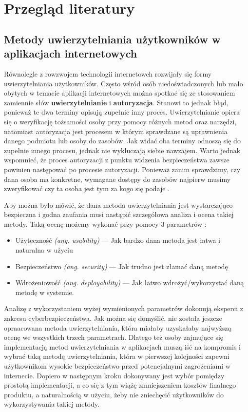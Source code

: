 \chapter{Przegląd literatury}
\section{Metody uwierzytelniania użytkowników w aplikacjach internetowych}
Równolegle z rowzwojem technologii internetowch rozwijały się formy uwierzytelniania użytkowników. Często wśród osób niedoświadczonych lub mało obytych w temacie aplikacji internetowych można spotkać się ze stosowaniem zamiennie słów \textbf{uwierzytelnianie} i \textbf{autoryzacja}. Stanowi to jednak błąd, ponieważ te dwa terminy opisują zupełnie inny proces. Uwierzytelnianie opiera się o weryfikację tożsamości osoby przy pomocy różnych metod oraz narzędzi, natomiast autoryzacja jest procesem w którym sprawdzane są uprawnienia danego podmiotu lub osoby do zasobów. Jak widać oba terminy odnoszą się do zupełnie innego procesu, jednak nie wykluczają siebie nawzajem. Warto jednak wspomnieć, że proces autoryzacji z punktu widzenia bezpieczeństwa zawsze powinien następować po procesie autoryzacji. Ponieważ zanim sprawdzimy, czy dana osoba ma konkretne, wymagane dostępy do zasobów najpierw musimy zweryfikować czy ta osoba jest tym za kogo się podaje \cite{JK2020}.

Aby można było mówić, że dana metoda uwierzytelniania jest wystarczająco bezpieczna i godna zaufania musi nastąpić szczegółowa analiza i ocena takiej metody. Taką ocenę możemy wykonać przy pomocy 3 parametrów \cite{CyberArk}:
\begin{itemize}
  \item Użyteczność \emph{(ang. usability)} --- Jak bardzo dana metoda jest łatwa i naturalna w użyciu
  \item Bezpieczeństwo \emph{(ang. security)} --- Jak trudno jest złamać daną metodę
  \item Wdrożeniowość \emph{(ang. deployability)} --- Jak łatwo wdrożyć/wykorzystać daną metodę w systemie.  
\end{itemize}

Analizę z wykorzystaniem wyżej wymienionych parametrów dokonują eksperci z zakresu cyberbezpieczeństwa. Jak można się domyślić, nie została jeszcze opraacowana metoda uwierzytelniania, która miałaby uzyskałaby najwyższą ocenę we wszystkich trzech parametrach. Dlatego też osoby zajmujące się implementacją metod uwierzytelniania w aplikacjach muszą iść na kompromis i wybrać taką metodę uwierzytelniania, która w pierwszej kolejności zapewni użytkownikom wysokie bezpieczeństwo przed potencjalnymi zagrożeniami w internecie. Dopiero w następnym kroku dokonywany jest wybór pomiędzy prostotą implementacji, a co się z tym wiążę zmniejszeniem kosztów finalnego produktu, a naturalnością w użyciu, żeby nie zniechęcić użytkowników do wykorzystywania takiej metody. 

